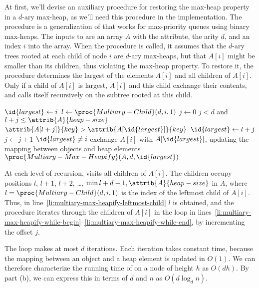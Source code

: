 At first, we'll devise an auxiliary procedure for restoring the max-heap property in a $d$-ary max-heap, as we'll need this procedure in the  implementation.
The procedure  is a generalization of  that works for max-priority queues using binary max-heaps.
The inputs to  are an array $A$ with the  attribute, the arity $d$, and an index $i$ into the array.
When the procedure is called, it assumes that the $d$-ary trees rooted at each child of node $i$ are $d$-ary max-heaps, but that $A[i]$ might be smaller than its children, thus violating the max-heap property.
To restore it, the procedure determines the largest of the elements $A[i]$ and all children of $A[i]$.
Only if a child of $A[i]$ is largest, $A[i]$ and this child exchange their contents, and  calls itself recursively on the subtree rooted at this child.

\begin{codebox}
\li $\id{largest}\gets i$
\li $l\gets\proc{Multiary-Child}(d,i,1)$ \label{li:multiary-max-heapify-leftmost-child}
\li $j\gets0$
\li \While $j<d$ and $l+j\le\attrib{A}{heap-size}$ \label{li:multiary-max-heapify-while-begin}
\li     \Do \If $\attrib{A[l+j]}{key}>\attrib{A[\id{largest}]}{key}$
\li             \Then $\id{largest}\gets l+j$
                \End
\li         $j\gets j+1$
        \End \label{li:multiary-max-heapify-while-end}
\li \If $\id{largest}\ne i$
\li     \Then exchange $A[i]$ with $A[\id{largest}]$,
\zi         \>updating the mapping between objects and heap elements
\li         $\proc{Multiary-Max-Heapify}(A,d,\id{largest})$
        \End
\end{codebox}

At each level of recursion,  visits all children of $A[i]$.
The children occupy positions $l$, $l+1$, $l+2$, \dots, $\min{l+d-1,\attrib{A}{heap-size}}$ in $A$, where $l=\proc{Multiary-Child}(d,i,1)$ is the index of the leftmost child of $A[i]$.
Thus, in line~\ref{li:multiary-max-heapify-leftmost-child} $l$ is obtained, and the procedure iterates through the children of $A[i]$ in the  loop in lines~\ref{li:multiary-max-heapify-while-begin}--\ref{li:multiary-max-heapify-while-end}, by incrementing the offset $j$.

The  loop makes at most $d$ iterations.
Each iteration takes constant time, because the mapping between an object and a heap element is updated in $O(1)$.
We can therefore characterize the running time of  on a node of height $h$ as $O(dh)$.
By part (b), we can express this in terms of $d$ and $n$ as $O(d\log_dn)$.

